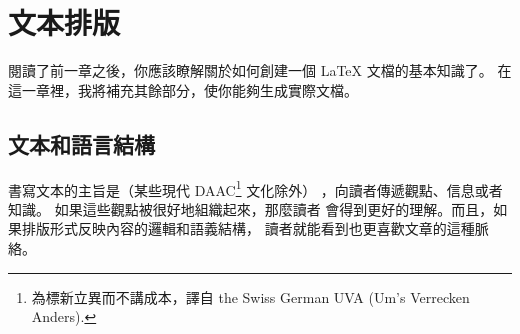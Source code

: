 

\chapter{文本排版}

\begin{intro}
閱讀了前一章之後，你應該瞭解關於如何創建一個 \LaTeX{} 文檔的基本知識了。
在這一章裡，我將補充其餘部分，使你能夠生成實際文檔。
\end{intro}


\section{文本和語言結構}
 \indent
書寫文本的主旨是（某些現代 DAAC\footnote{為標新立異而不講成本，譯自 the
Swiss German UVA (Um's Verrecken Anders).} 文化除外）
，向讀者傳遞觀點、信息或者知識。
如果這些觀點被很好地組織起來，那麼讀者
會得到更好的理解。而且，如果排版形式反映內容的邏輯和語義結構，
讀者就能看到也更喜歡文章的這種脈絡。

